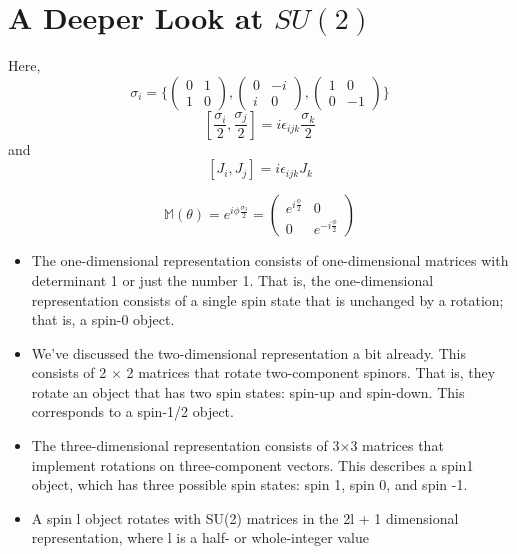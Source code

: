 \documentclass[]{article}
\begin{document}
\section{A Deeper Look at $SU(2)$}
Here,
$$\sigma_{i} = \{ \begin{pmatrix}
0 & 1\\
1 & 0
\end{pmatrix}, \begin{pmatrix}
0 & -i\\
i & 0
\end{pmatrix}, \begin{pmatrix}
1 & 0\\
0 & -1
\end{pmatrix} \}$$
\begin{equation}
\left[\frac{\sigma_{i}}{2}, \frac{\sigma_{j}}{2}\right] = i \epsilon_{ijk}\frac{\sigma_{k}}{2}
\end{equation}
and
\begin{equation}
\left[J_{i}, J_{j}\right] = i \epsilon_{ijk}J_{k}
\end{equation}

\begin{equation}
\mathbb{M} (\theta) = e^{i \phi  \frac{\sigma_{3}}{2}} = \begin{pmatrix}
e^{i \frac{\phi}{2}} & 0 \\
0 & e^{-i \frac{\phi}{2}}
\end{pmatrix}
\end{equation}

\begin{itemize}
\item The one-dimensional representation consists of one-dimensional matrices
with determinant 1 or just the number 1. That is, the one-dimensional
representation consists of a single spin state that is unchanged by a
rotation; that is, a spin-0 object.
\item We’ve discussed the two-dimensional representation a bit already. This
consists of 2 × 2 matrices that rotate two-component spinors. That is,
they rotate an object that has two spin states: spin-up and spin-down.
This corresponds to a spin-1/2 object.
\item The three-dimensional representation consists of 3×3 matrices that implement rotations on three-component vectors. This describes a spin1 object, which has three possible spin states: spin 1, spin 0, and spin -1.
\item A spin l object rotates with SU(2) matrices in the 2l + 1 dimensional representation, where l is a half- or whole-integer value
\end{itemize}
\end{document}
